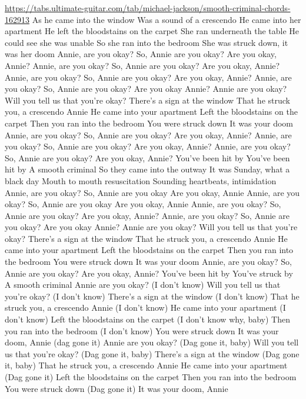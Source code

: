\url{https://tabs.ultimate-guitar.com/tab/michael-jackson/smooth-criminal-chords-162913}
As he came into the window
Was a sound of a crescendo
He came into her apartment
He left the bloodstains on the carpet
She ran underneath the table
He could see she was unable
So she ran into the bedroom
She was struck down, it was her doom
Annie, are you okay?
So, Annie are you okay?
Are you okay, Annie?
Annie, are you okay?
So, Annie are you okay?
Are you okay, Annie?
Annie, are you okay?
So, Annie are you okay?
Are you okay, Annie?
Annie, are you okay?
So, Annie are you okay? Are you okay Annie?
Annie are you okay?
Will you tell us that you're okay?
There's a sign at the window
That he struck you, a crescendo Annie
He came into your apartment
Left the bloodstains on the carpet
Then you ran into the bedroom
You were struck down
It was your doom
Annie, are you okay?
So, Annie are you okay?
Are you okay, Annie?
Annie, are you okay?
So, Annie are you okay?
Are you okay, Annie?
Annie, are you okay?
So, Annie are you okay?
Are you okay, Annie?
You've been hit by
You've been hit by
A smooth criminal
So they came into the outway
It was Sunday, what a black day
Mouth to mouth resuscitation
Sounding heartbeats, intimidation
Annie, are you okay?
So, Annie are you okay
Are you okay, Annie
Annie, are you okay?
So, Annie are you okay
Are you okay, Annie
Annie, are you okay?
So, Annie are you okay?
Are you okay, Annie?
Annie, are you okay?
So, Annie are you okay? Are you okay Annie?
Annie are you okay?
Will you tell us that you're okay?
There's a sign at the window
That he struck you, a crescendo Annie
He came into your apartment
Left the bloodstains on the carpet
Then you ran into the bedroom
You were struck down
It was your doom
Annie, are you okay?
So, Annie are you okay?
Are you okay, Annie?
You've been hit by
You've struck by
A smooth criminal
Annie are you okay?
(I don't know)
Will you tell us that you're okay?
(I don't know)
There's a sign at the window
(I don't know)
That he struck you, a crescendo Annie
(I don't know)
He came into your apartment
(I don't know)
Left the bloodstains on the carpet
(I don't know why, baby)
Then you ran into the bedroom
(I don't know)
You were struck down
It was your doom, Annie (dag gone it)
Annie are you okay?
(Dag gone it, baby)
Will you tell us that you're okay?
(Dag gone it, baby)
There's a sign at the window
(Dag gone it, baby)
That he struck you, a crescendo Annie
He came into your apartment
(Dag gone it)
Left the bloodstains on the carpet
Then you ran into the bedroom
You were struck down
(Dag gone it)
It was your doom, Annie